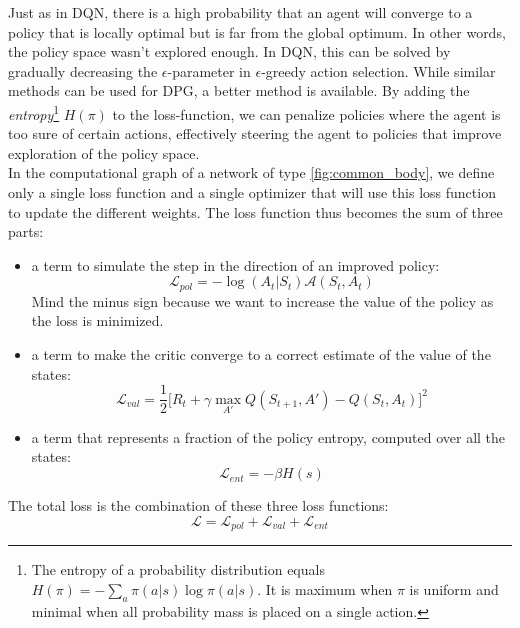Just as in DQN, there is a high probability that an agent will converge to a policy that is locally optimal but is far from the global optimum. In other words, the policy space wasn't explored enough. In DQN, this can be solved by gradually decreasing the $\epsilon$-parameter in $\epsilon$-greedy action selection. While similar methods can be used for DPG, a better method is available. By adding the \emph{entropy}\footnote{The entropy of a probability distribution equals $H(\pi) = -\sum_{a} \pi(a|s) \log \pi(a|s)$. It is maximum when $\pi$ is uniform and minimal when all probability mass is placed on a single action.} $H(\pi)$ to the loss-function, we can penalize policies where the agent is too sure of certain actions, effectively steering the agent to policies that improve exploration of the policy space.\\
In the computational graph of a network of type \ref{fig:common_body}, we define only a single loss function and a single optimizer that will use this loss function to update the different weights. The loss function thus becomes the sum of three parts:
\begin{itemize}
    \item a term to simulate the step in the direction of an improved policy:\\ \begin{equation} \mathcal{L}_{pol} = -\log(A_t|S_t) \mathcal{A}(S_t, A_t) \end{equation} Mind the minus sign because we want to increase the value of the policy as the loss is minimized.
    \item a term to make the critic converge to a correct estimate of the value of the states:\\
    \begin{equation} \mathcal{L}_{val} =  \frac{1}{2} \big[ R_t + \gamma \max_{A'} Q(S_{t+1}, A') - Q(S_t, A_t)\big]^2 \end{equation} 
    \item a term that represents a fraction of the policy entropy, computed over all the states:\\ \begin{equation} \mathcal{L}_{ent} = -\beta H(s)\end{equation} 
\end{itemize}
The total loss is the combination of these three loss functions:
\begin{equation}
\mathcal{L} = \mathcal{L}_{pol} + \mathcal{L}_{val} + \mathcal{L}_{ent} 
\end{equation} 

